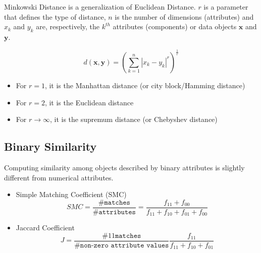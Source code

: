 Minkowski Distance is a generalization of Euclidean Distance. $r$ is a parameter that defines the type of distance, $n$ is the number of dimensions (attributes) and $x_k$ and $y_k$ are, respectively, the $k^{th}$ attributes (components) or data objects $\mathbf{x}$ and $\mathbf{y}$.

\[
d(\mathbf{x}, \mathbf{y}) = \left(\sum_{k=1}^{n} |x_k - y_k|^r\right)^{\frac{1}{r}}
\]

\begin{itemize}
	\item For $r=1$, it is the Manhattan distance (or city block/Hamming distance)
	\item For $r=2$, it is the Euclidean distance
	\item For $r \rightarrow \infty$, it is the supremum distance (or Chebyshev distance)
\end{itemize}


\subsection{Binary Similarity}
Computing similarity among objects described by binary attributes is slightly different from numerical attributes.
\begin{itemize}
	\item Simple Matching Coefficient (SMC)
	      \[
		      SMC = \frac{\texttt{\#matches}}{\texttt{\#attributes}}=\frac{f_{11} + f_{00}}{f_{11} + f_{10} + f_{01} + f_{00}}
	      \]
	\item Jaccard Coefficient
	      \[
		      J = \frac{\texttt{\#}11\texttt{matches}}{\texttt{\#non-zero attribute values}}\frac{f_{11}}{f_{11} + f_{10} + f_{01}}
	      \]
\end{itemize}

